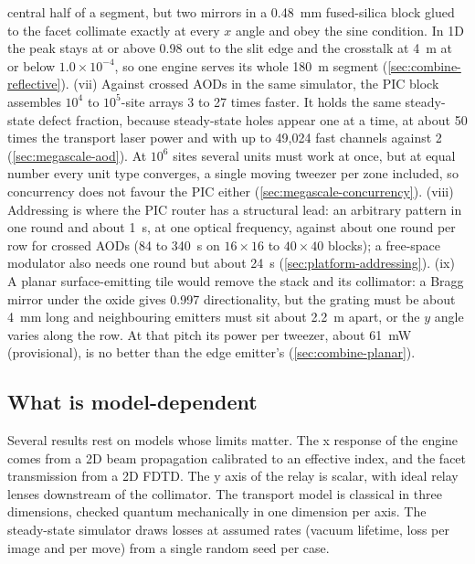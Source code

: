 central half of a segment, but two mirrors in a 0.48~mm fused-silica block glued to the facet collimate exactly at
every $x$ angle and obey the sine condition. In 1D the peak stays at or above 0.98 out to the slit edge and the
crosstalk at 4~\textmu m at or below $1.0\times10^{-4}$, so one engine serves its whole 180~\textmu m segment
(\cref{sec:combine-reflective}). (vii) Against crossed AODs in the same simulator, the PIC block assembles $10^4$ to
$10^5$-site arrays 3 to 27 times faster. It holds the same steady-state defect fraction, because steady-state holes
appear one at a time, at about 50 times the transport laser power and with up to 49,024 fast channels against 2
(\cref{sec:megascale-aod}). At $10^6$ sites several units must work at once, but at equal number every unit type
converges, a single moving tweezer per zone included, so concurrency does not favour the PIC either
(\cref{sec:megascale-concurrency}). (viii) Addressing is where the PIC router has a structural lead: an arbitrary
pattern in one round and about 1~\textmu s, at one optical frequency, against about one round per row for crossed AODs
(84 to 340~\textmu s on $16\times16$ to $40\times40$ blocks); a free-space modulator also needs one round but about
24~\textmu s (\cref{sec:platform-addressing}). (ix) A planar surface-emitting tile would remove the stack and its
collimator: a Bragg mirror under the oxide gives 0.997 directionality, but the grating must be about 4~mm long and
neighbouring emitters must sit about 2.2~\textmu m apart, or the $y$ angle varies along the row. At that pitch its
power per tweezer, about 61~mW (provisional), is no better than the edge emitter's (\cref{sec:combine-planar}).

\subsection{What is model-dependent}\label{sec:discussion-model}

Several results rest on models whose limits matter. The x response of the engine comes from a 2D beam
propagation calibrated to an effective index, and the facet transmission from a 2D FDTD. The y axis of the
relay is scalar, with ideal relay lenses downstream of the collimator. The transport model is classical in
three dimensions, checked quantum mechanically in one dimension per axis. The steady-state simulator draws
losses at assumed rates (vacuum lifetime, loss per image and per move) from a single random seed per case.

